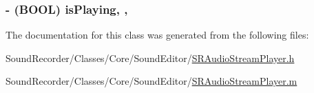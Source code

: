 \hypertarget{interface_s_r_audio_stream_player_a870fcee585d9870bcdc03b829cfd16f0}{
\subsubsection[{is\-Playing}]{\setlength{\rightskip}{0pt plus 5cm}-\/ (B\-O\-O\-L) is\-Playing\hspace{0.3cm}{\ttfamily [read]}, {\ttfamily [nonatomic]}, {\ttfamily [assign]}}}\label{interface_s_r_audio_stream_player_a870fcee585d9870bcdc03b829cfd16f0}


The documentation for this class was generated from the following files\-:\begin{DoxyCompactItemize}
\item 
Sound\-Recorder/\-Classes/\-Core/\-Sound\-Editor/\hyperlink{_s_r_audio_stream_player_8h}{S\-R\-Audio\-Stream\-Player.\-h}\item 
Sound\-Recorder/\-Classes/\-Core/\-Sound\-Editor/\hyperlink{_s_r_audio_stream_player_8m}{S\-R\-Audio\-Stream\-Player.\-m}\end{DoxyCompactItemize}
